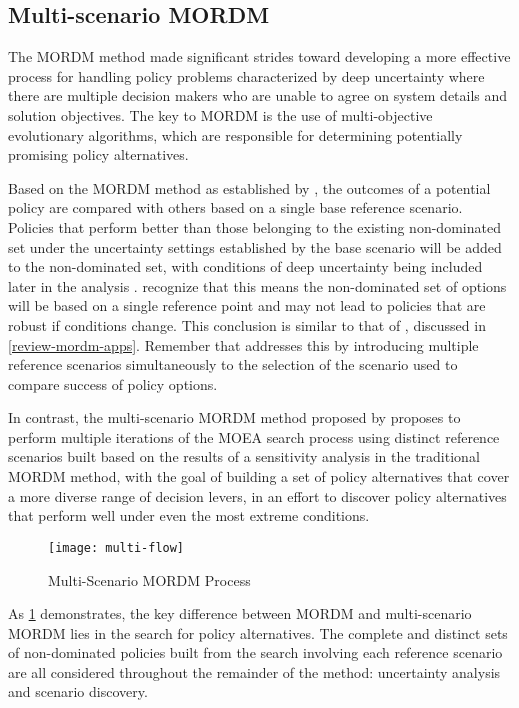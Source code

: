     \subsection{Multi-scenario MORDM}
    The MORDM method made significant strides toward developing a more effective process for handling policy problems characterized by deep uncertainty where there are multiple decision makers who are unable to agree on system details and solution objectives. The key to MORDM is the use of multi-objective evolutionary algorithms, which are responsible for determining potentially promising policy alternatives. 
    
    Based on the MORDM method as established by \citet{Kasprzyk2013}, the outcomes of a potential policy are compared with others based on a single base reference scenario. Policies that perform better than those belonging to the existing non-dominated set under the uncertainty settings established by the base scenario will be added to the non-dominated set, with conditions of deep uncertainty being included later in the analysis \citep{Eker2018}. \citet{Watson2017} recognize that this means the non-dominated set of options will be based on a single reference point and may not lead to policies that are robust if conditions change. This conclusion is similar to that of \citet{Trindade2017}, discussed in \cref{review-mordm-apps}. Remember that \citet{Trindade2017} addresses this by introducing multiple reference scenarios simultaneously to the selection of the scenario used to compare success of policy options. 
    
    In contrast, the multi-scenario MORDM method proposed by \citet{Watson2017} proposes to perform multiple iterations of the MOEA search process using distinct reference scenarios built based on the results of a sensitivity analysis in the traditional MORDM method, with the goal of building a set of policy alternatives that cover a more diverse range of decision levers, in an effort to discover policy alternatives that perform well under even the most extreme conditions. 
    
    \begin{figure}[ht]
        \centering
        \captionsetup{justification=centering}
        
        \texttt{[image: multi-flow]}
        \caption{Multi-Scenario MORDM Process}
        \label{fig:multi-flow}
    \end{figure}
    
    As \cref{fig:multi-flow} demonstrates, the key difference between MORDM and multi-scenario MORDM lies in the search for policy alternatives. The complete and distinct sets of non-dominated policies built from the search involving each reference scenario are all considered throughout the remainder of the method: uncertainty analysis and scenario discovery. 

